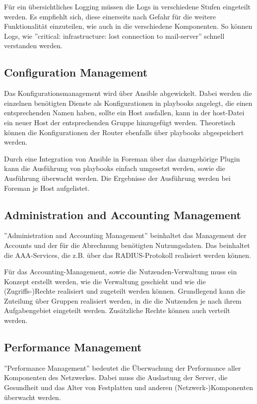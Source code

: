 Für ein übersichtliches Logging müssen die Logs in verschiedene Stufen eingeteilt werden. Es empfiehlt sich, diese einerseits nach Gefahr für die weitere Funktionalität einzuteilen, wie auch in die verschiedene Komponenten. So können Logs, wie ''critical: infrastructure: lost connection to mail-server'' schnell verstanden werden.

\subsection{Configuration Management}
Das Konfigurationsmanagement wird über Ansible abgewickelt. Dabei werden die einzelnen benötigten Dienste als Konfigurationen in playbooks angelegt, die einen entsprechenden Namen haben, sollte ein Host ausfallen, kann in der host-Datei ein neuer Host der entsprechenden Gruppe hinzugefügt werden. Theoretisch können die Konfigurationen der Router ebenfalls über playbooks abgespeichert werden. 

Durch eine Integration von Ansible in Foreman über das dazugehörige Plugin kann die Ausführung von playbooks einfach umgesetzt werden, sowie die Ausführung überwacht werden. Die Ergebnisse der Ausführung werden bei Foreman je Host aufgelistet.

\subsection{Administration and Accounting Management}
''Administration and Accounting Management'' beinhaltet das Management der Accounts und der für die Abrechnung benötigten Nutzungsdaten. Das beinhaltet die AAA-Services, die z.B. über das RADIUS-Protokoll realisiert werden können. 

Für das Accounting-Management, sowie die Nutzenden-Verwaltung muss ein Konzept erstellt werden, wie die Verwaltung geschieht und wie die (Zugriffs-)Rechte realisiert und zugeteilt werden können. Grundlegend kann die Zuteilung über Gruppen realisiert werden, in die die Nutzenden je nach ihrem Aufgabengebiet eingeteilt werden. Zusätzliche Rechte können auch verteilt werden.

\subsection{Performance Management}
''Performance Management'' bedeutet die Überwachung der Performance aller Komponenten des Netzwerkes. Dabei muss die Auslastung der Server, die Gesundheit und das Alter von Festplatten und anderen (Netzwerk-)Komponenten überwacht werden.


